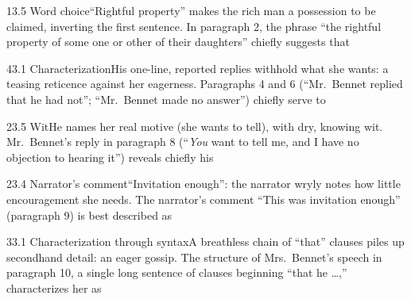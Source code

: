 \documentclass[11pt]{article}
\begin{document}
\begin{q}{1}{3.5 Word choice}{``Rightful property'' makes the rich man a possession to be claimed, inverting the first sentence.}
In paragraph 2, the phrase ``the rightful property of some one or other of their daughters'' chiefly suggests that
\end{q}

\begin{q}{4}{3.1 Characterization}{His one-line, reported replies withhold what she wants: a teasing reticence against her eagerness.}
Paragraphs 4 and 6 (``Mr.\ Bennet replied that he had not''; ``Mr.\ Bennet made no answer'') chiefly serve to
\end{q}

\begin{q}{2}{3.5 Wit}{He names her real motive (she wants to tell), with dry, knowing wit.}
Mr.\ Bennet's reply in paragraph 8 (``\emph{You} want to tell me, and I have no objection to hearing it'') reveals chiefly his
\end{q}

\begin{q}{2}{3.4 Narrator's comment}{``Invitation enough'': the narrator wryly notes how little encouragement she needs.}
The narrator's comment ``This was invitation enough'' (paragraph 9) is best described as
\end{q}

\begin{q}{3}{3.1 Characterization through syntax}{A breathless chain of ``that'' clauses piles up secondhand detail: an eager gossip.}
The structure of Mrs.\ Bennet's speech in paragraph 10, a single long sentence of clauses beginning ``that he \ldots,'' characterizes her as
\end{q}
\end{document}
